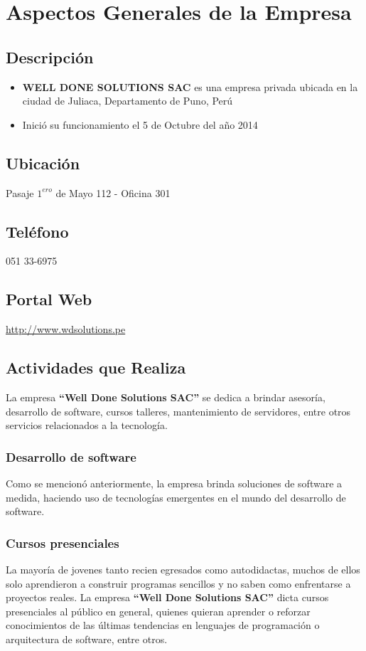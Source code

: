 \chapter{Aspectos Generales de la Empresa}

	\section{Descripción}
		\begin{itemize}
			\item {{\bf WELL DONE SOLUTIONS SAC} es una empresa privada ubicada en la
			ciudad de Juliaca, Departamento de Puno, Perú}
			\item {Inició su funcionamiento el 5 de Octubre  del año 2014}
		\end{itemize}
		
	\section{Ubicación}
		Pasaje $1^{ero}$ de Mayo 112 - Oficina 301
		
	\section{Teléfono}
		051 33-6975
		
	\section{Portal Web}
		\href{http://www.wdsolutions.pe}{http://www.wdsolutions.pe}
	
	\section{Actividades que Realiza}
		La empresa {\bf ``Well Done Solutions SAC''} se dedica a brindar asesoría,
		desarrollo de software, cursos talleres, mantenimiento de servidores, entre
		otros servicios relacionados a la tecnología.
	
		\subsection{Desarrollo de software}
			Como se mencionó anteriormente, la empresa brinda soluciones de
			software a medida, haciendo uso de tecnologías emergentes en el mundo del desarrollo de software.
			
		\subsection{Cursos presenciales}
			La mayoría de jovenes tanto recien egresados como autodidactas, muchos de
			ellos solo aprendieron a construir programas sencillos y no saben como
			enfrentarse a proyectos reales. La empresa  {\bf ``Well
			Done Solutions SAC''} dicta cursos presenciales al público en general,
			quienes quieran aprender o reforzar conocimientos de las últimas tendencias
			en lenguajes de programación o arquitectura de software, entre otros.
			
